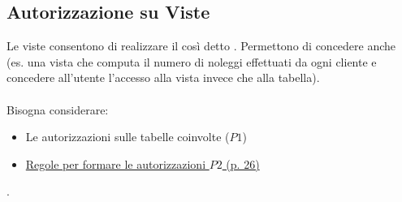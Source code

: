 \documentclass[12pt]{article}
\begin{document}
\subsection{Autorizzazione su Viste}
Le viste consentono di realizzare il così detto
. Permettono di concedere anche  (es. una vista che computa il numero di noleggi effettuati da ogni cliente e concedere all'utente l'accesso alla vista invece che alla tabella).\\
\\
Bisogna considerare:
\begin{itemize}
    \item Le autorizzazioni sulle tabelle coinvolte ($P1$)
    \item \href{https://2023.aulaweb.unige.it/pluginfile.php/352757/mod_resource/content/3/LinguaggioSQLParte4DatiDerivati-23-24.pdf}{Regole per formare le autorizzazioni $P2$ (p. 26)}
\end{itemize}
.
\end{document}
